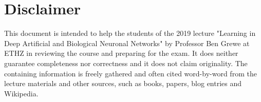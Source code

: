 \documentclass[main]{subfiles}
\begin{document}
\newpage
\section{Disclaimer}
This document is intended to help the students of the 2019 lecture "Learning in Deep Artificial and Biological Neuronal Networks" by Professor Ben Grewe at ETHZ in reviewing the course and preparing for the exam. It does neither guarantee completeness nor correctness and it does not claim originality. The containing information is freely gathered and often cited word-by-word from the lecture materials and other sources, such as books, papers, blog entries and Wikipedia.
\end{document}
